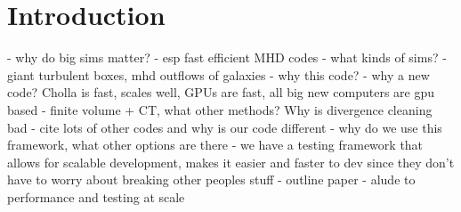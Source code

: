 \section{Introduction}
\label{sec:intro}

- why do big sims matter?
  - esp fast efficient MHD codes
  - what kinds of sims?
    - giant turbulent boxes, mhd outflows of galaxies
- why this code? 
  - why a new code? Cholla is fast, scales well, GPUs are fast, all big new computers are gpu based
  - finite volume + CT, what other methods? Why is divergence cleaning bad
  - cite lots of other codes and why is our code different
  - why do we use this framework, what other options are there
  - we have a testing framework that allows for scalable development, makes it easier and faster to dev since they don't have to worry about breaking other peoples stuff
- outline paper
  - alude to performance and testing at scale